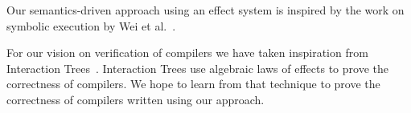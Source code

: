 \documentclass[a4paper,UKenglish,cleveref, autoref, thm-restate, anonymous]{oasics-v2021}
\begin{document}
Our semantics-driven approach using an effect system is inspired by the work on symbolic execution by Wei et al.~\cite{10.1145/3428232}.

For our vision on verification of compilers we have taken inspiration from Interaction Trees~\cite{10.1145/3371119}.
Interaction Trees use algebraic laws of effects to prove the correctness of compilers.
We hope to learn from that technique to prove the correctness of compilers written using our approach.

% 
\end{document}
